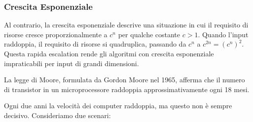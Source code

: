 \subsubsection{Crescita Esponenziale}
Al contrario, la crescita esponenziale descrive una situazione in cui il requisito di risorse cresce
proporzionalmente a \(c^n\) per qualche costante \(c > 1\). Quando l'input raddoppia, il requisito di
risorse si quadruplica, passando da \(c^n\) a \(c^{2n} = (c^n)^2\). Questa rapida escalation rende gli
algoritmi con crescita esponenziale impraticabili per input di grandi dimensioni.

\begin{figure}[H]
    \centering
\end{figure}
\begin{pastelbox1}[title=Legge di Moore]
    La legge di Moore, formulata da Gordon Moore nel 1965, afferma che il numero di transistor
    in un microprocessore raddoppia approssimativamente ogni 18 mesi.
\end{pastelbox1}
Ogni due anni la velocità dei computer raddoppia, ma questo non è sempre decisivo.
Consideriamo due scenari:
    

